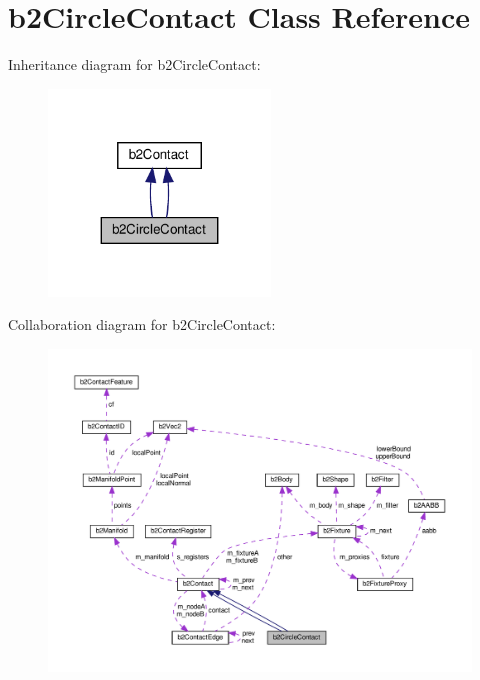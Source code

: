 \hypertarget{classb2CircleContact}{}\section{b2\+Circle\+Contact Class Reference}
\label{classb2CircleContact}


Inheritance diagram for b2\+Circle\+Contact\+:
\nopagebreak
\begin{figure}[H]
\begin{center}
\leavevmode
\includegraphics[width=167pt]{classb2CircleContact__inherit__graph}
\end{center}
\end{figure}


Collaboration diagram for b2\+Circle\+Contact\+:
\nopagebreak
\begin{figure}[H]
\begin{center}
\leavevmode
\includegraphics[width=350pt]{classb2CircleContact__coll__graph}
\end{center}
\end{figure}
